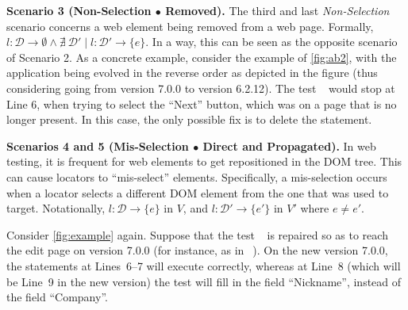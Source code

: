 \noindent
\textbf{Scenario 3 (Non-Selection $\bullet$ Removed).} 
%
The third and last \textit{Non-Selection} scenario concerns a web element being removed from a web page. Formally, $l: \mathcal{D} \rightarrow \emptyset \land \nexists \ \mathcal{D'} \mid l: \mathcal{D'} \rightarrow \{e\}$.
In a way, this can be seen as the opposite scenario of Scenario 2. 
As a concrete example, consider the example of \autoref{fig:ab2}, with the application being evolved in the reverse order as depicted in the figure (thus considering going from version 7.0.0 to version 6.2.12). The test~\textcircled{} would stop at Line 6, when trying to select the ``Next'' button, which was on a page that is no longer present. In this case, the only possible fix is to delete the statement.


\noindent
\textbf{Scenarios 4 and 5 (Mis-Selection $\bullet$ Direct and Propagated).}\label{sec:misselection}
In web testing, it is frequent for web elements to get repositioned in the DOM tree. This can cause locators to ``mis-select'' elements.
Specifically, a mis-selection occurs when a locator selects a different DOM element from the one that was used to target. 
Notationally, $l: \mathcal{D} \rightarrow \{e\}$ in $V$, and $l: \mathcal{D}' \rightarrow \{e'\}$ in $V'$ where $e \ne e'$.

Consider \autoref{fig:example} again. 
Suppose that the test~\textcircled{} is repaired so as to reach the edit page on version 7.0.0 (for instance, as in~\textcircled{}). On the new version 7.0.0, the statements at Lines~6--7 will execute correctly, whereas at Line~8 (which will be Line~9 in the new version) the test will fill in the field ``Nickname'', instead of the field ``Company''.

